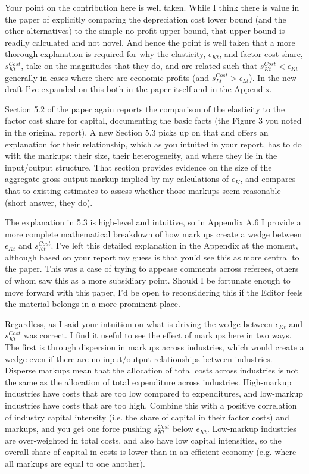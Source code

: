 \documentclass[11pt]{article}
\begin{document}
Your point on the contribution here is well taken. While I think there is value in the paper of explicitly comparing the depreciation cost lower bound (and the other alternatives) to the simple no-profit upper bound, that upper bound is readily calculated and not novel. And hence the point is well taken that a more thorough explanation is required for why the elasticity, $\epsilon_{Kt}$, and factor cost share, $s_{Kt}^{Cost}$, take on the magnitudes that they do, and are related such that $s_{Kt}^{Cost} < \epsilon_{Kt}$ generally in cases where there are economic profits (and $s_{Lt}^{Cost} > \epsilon_{Lt}$). In the new draft I've expanded on this both in the paper itself and in the Appendix. 

Section 5.2 of the paper again reports the comparison of the elasticity to the factor cost share for capital, documenting the basic facts (the Figure 3 you noted in the original report). A new Section 5.3 picks up on that and offers an explanation for their relationship, which as you intuited in your report, has to do with the markups: their size, their heterogeneity, and where they lie in the input/output structure. That section provides evidence on the size of the aggregate gross output markup implied by my calculations of $\epsilon_K$, and compares that to existing estimates to assess whether those markups seem reasonable (short answer, they do). 

The explanation in 5.3 is high-level and intuitive, so in Appendix A.6 I provide a more complete mathematical breakdown of how markups create a wedge between $\epsilon_{Kt}$ and $s_{Kt}^{Cost}$. I've left this detailed explanation in the Appendix at the moment, although based on your report my guess is that you'd see this as more central to the paper. This was a case of trying to appease comments across referees, others of whom saw this as a more subsidiary point. Should I be fortunate enough to move forward with this paper, I'd be open to reconsidering this if the Editor feels the material belongs in a more prominent place. 

Regardless, as I said your intuition on what is driving the wedge between $\epsilon_{Kt}$ and $s_{Kt}^{Cost}$ was correct. I find it useful to see the effect of markups here in two ways. The first is through dispersion in markups across industries, which would create a wedge even if there are no input/output relationships between industries. Disperse markups mean that the allocation of total costs across industries is not the same as the allocation of total expenditure across industries. High-markup industries have costs that are too low compared to expenditures, and low-markup industries have costs that are too high. Combine this with a positive correlation of industry capital intensity (i.e. the share of capital in their factor costs) and markups, and you get one force pushing $s_{Kt}^{Cost}$ below $\epsilon_{Kt}$. Low-markup industries are over-weighted in total costs, and also have low capital intensities, so the overall share of capital in costs is lower than in an efficient economy (e.g. where all markups are equal to one another).
\end{document}
